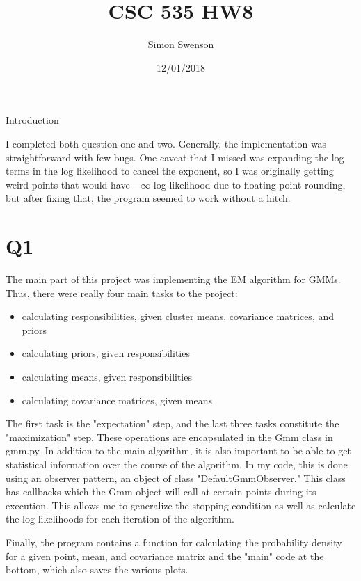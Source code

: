 \documentclass{article}
\title{CSC 535 HW8}
\date{12/01/2018}
\author{Simon Swenson}
\begin{document}
\maketitle
{}

\large Introduction

\small I completed both question one and two. Generally, the implementation was 
straightforward with few bugs. One caveat that I missed was expanding the log 
terms in the log likelihood to cancel the exponent, so I was originally getting 
weird points that would have $-\infty$ log likelihood due to floating point 
rounding, but after fixing that, the program seemed to work without a hitch.

\section{Q1}

The main part of this project was implementing the EM algorithm for GMMs. Thus, 
there were really four main tasks to the project:

\begin{itemize}
    \item calculating responsibilities, given cluster means, covariance 
        matrices, and priors
    \item calculating priors, given responsibilities
    \item calculating means, given responsibilities
    \item calculating covariance matrices, given means
\end{itemize}

The first task is the "expectation" step, and the last three tasks 
constitute the "maximization" step. These operations are encapsulated in the Gmm 
class in gmm.py. In addition to the main algorithm, it is also important to be 
able to get statistical information over the course of the algorithm. In my 
code, this is done using an observer pattern, an object of class 
"DefaultGmmObserver." This class has callbacks which the Gmm object will call 
at certain points during its execution. This allows me to generalize the stopping 
condition as well as calculate the log likelihoods for each iteration of the 
algorithm.

Finally, the program contains a function for calculating the probability 
density for a given point, mean, and covariance matrix and the "main" code at 
the bottom, which also saves the various plots.
\end{document}
